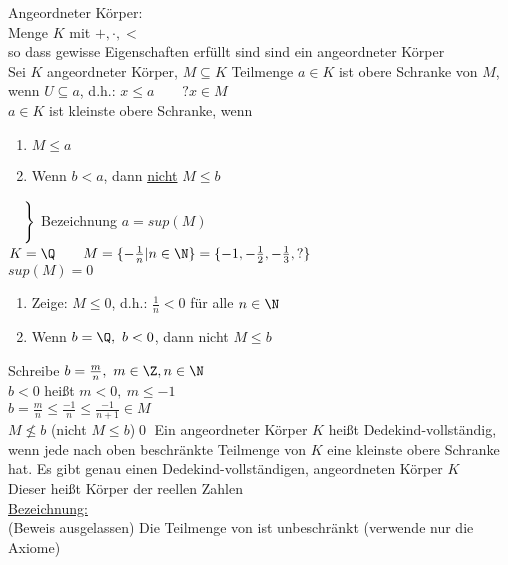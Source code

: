 \wdh
Angeordneter Körper:\\
Menge $K$ mit $+, ·, <$\\
so dass gewisse Eigenschaften erfüllt sind
\bsp
\Q{} sind ein angeordneter Körper\\
Sei $K$ angeordneter Körper, $M\subseteq K$ Teilmenge $a\in K$ ist obere Schranke von $M$, wenn $U\subseteq a$, d.h.: $x\leq a\qquad ?x\in M$\\
$a\in K$ ist kleinste obere Schranke, wenn\\
\begin{enumerate}
\item{$M\leq a$}
\item{Wenn $b < a$, dann \underline{nicht} $M\leq b$}
\end{enumerate}
\vspace*{-9.5ex}\hspace*{15.5em}
$\left.
\begin{array}{l}
{}\vspace*{2ex}\\{}
\end{array}
\right\}$
\vspace*{-5ex}Bezeichnung $a=sup(M)$
\vspace*{5ex}
%
\bsp
$K=\Q\qquad M=\{-\frac{1}{n}|n\in\N\}=\{-1,-\frac{1}{2},-\frac{1}{3},?\}$\\
$sup(M)=0$
\bew
\begin{enumerate}
\item {Zeige: $M \leq 0$, d.h.: $\frac{1}{n}<0$ für alle $n\in\N$\ok}
\item {Wenn $b=\Q,\ b<0$, dann nicht $M\leq b$}
\end{enumerate}
Schreibe $b=\frac{m}{n},\ m\in\Z, n\in\N$\\[1ex]
$b<0$ heißt $m<0,\ m\leq -1$\\[1ex]
$b=\frac{m}{n} \leq \frac{-1}{n} \leq \frac{-1}{n+1}\in M$\\[1ex]
\Rarr{} $M\not\leq b$ (nicht $M\leq b$)\qed
%
\Def
Ein angeordneter Körper $K$ heißt Dedekind-vollständig, wenn jede nach oben beschränkte Teilmenge von $K$ eine kleinste obere Schranke hat.
\Satz
Es gibt genau einen Dedekind-vollständigen, angeordneten Körper $K$\\
Dieser heißt Körper der reellen Zahlen\\
\underline{Bezeichnung:} \R\\
(Beweis ausgelassen)
%
\Satz
Die Teilmenge \N{} von \R{} ist unbeschränkt
\bew
(verwende nur die Axiome)\\
